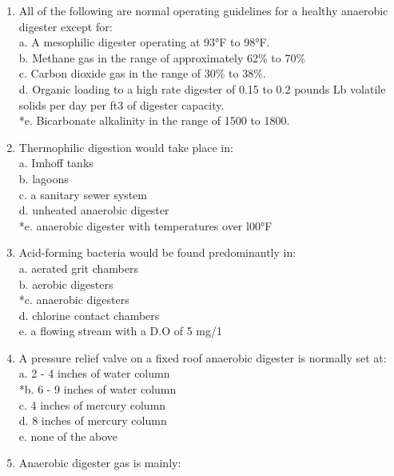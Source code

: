 \documentclass{article}
\begin{document}
\begin{enumerate}
\item  All of the following are normal operating guidelines for a healthy anaerobic digester except for: \\

a. A mesophilic digester operating at 93°F to 98°F. \\
b. Methane gas in the range of approximately 62\% to 70\% \\
c. Carbon dioxide gas in the range of 30\% to 38\%. \\
d. Organic loading to a high rate digester of 0.15 to 0.2 pounds Lb volatile solids per day per ft3 of digester capacity. \\
*e. Bicarbonate alkalinity in the range of 1500 to 1800. \\

\item  Thermophilic digestion would take place in: \\

a. Imhoff tanks \\
b. lagoons \\
c. a sanitary sewer system \\
d. unheated anaerobic digester \\
*e. anaerobic digester with temperatures over l00°F \\

\item  Acid-forming bacteria would be found predominantly in: \\

a. aerated grit chambers \\
b. aerobic digesters \\
*c. anaerobic digesters \\
d. chlorine contact chambers \\
e. a flowing stream with a D.O of 5 mg/1 \\

\item  A pressure relief valve on a fixed roof anaerobic digester is normally set at: \\

a. 2 - 4 inches of water column \\
*b. 6 - 9 inches of water column \\
c. 4 inches of mercury column \\
d. 8 inches of mercury column \\
e. none of the above \\

\item  Anaerobic digester gas is mainly: \\


\end{enumerate}
\end{document}
